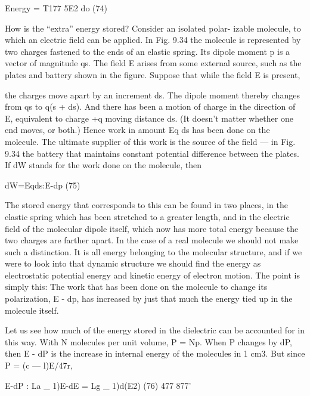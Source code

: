 {{{\begin{equation}
\end{equation}
Energy = T177 5E2 do (74)

How is the ``extra'' energy stored? Consider an isolated polar-
izable molecule, to which an electric field can be applied. In Fig. 9.34
the molecule is represented by two charges fastened to the ends of
an elastic spring. Its dipole moment p is a vector of magnitude qs.
The field E arises from some external source, such as the plates and
battery shown in the figure. Suppose that while the field E is present,

the charges move apart by an increment ds. The dipole moment
thereby changes from qs to q(s + ds). And there has been a motion
of charge in the direction of E, equivalent to charge +q moving distance
ds. (It doesn't matter whether one end moves, or both.)
Hence work in amount Eq ds has been done on the molecule. The
ultimate supplier of this work is the source of the field --- in Fig. 9.34
the battery that maintains constant potential difference between the
plates. If dW stands for the work done on the molecule, then

\begin{equation}
\end{equation}
dW=Eqds:E-dp (75)

The stored energy that corresponds to this can be found in two
places, in the elastic spring which has been stretched to a greater
length, and in the electric field of the molecular dipole itself, which
now has more total energy because the two charges are farther apart.
In the case of a real molecule we should not make such a distinction.
It is all energy belonging to the molecular structure, and if we were
to look into that dynamic structure we should find the energy as
electrostatic potential energy and kinetic energy of electron motion.
The point is simply this: The work that has been done on the molecule
to change its polarization, E - dp, has increased by just that much
the energy tied up in the molecule itself.

Let us see how much of the energy stored in the dielectric can be
accounted for in this way. With N molecules per unit volume,
P = Np. When P changes by dP, then E - dP is the increase in internal
energy of the molecules in 1 cm3. But since P = (c  ---  l)E/47r,

\begin{equation}
\end{equation}
E-dP : La _ 1)E-dE = Lg _ 1)d(E2) (76)
477 877'

}}}
